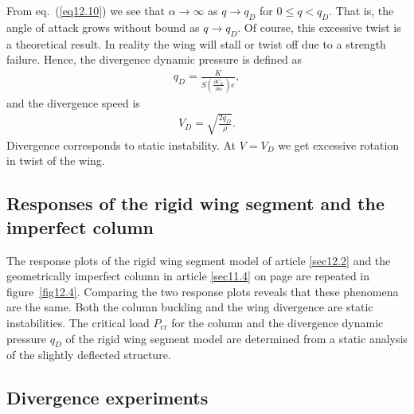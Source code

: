 \documentclass{AeroStructure-ERJohnson}
\begin{document}
From eq.~(\ref{eq12.10}) we see that $\alpha \rightarrow \infty$ as $q \rightarrow q_{D}$ for $0 \leq q<q_{D}$. That is, the angle of attack grows without bound as $q \rightarrow q_{D}$. Of course, this excessive twist is a theoretical result. In reality the wing will stall or twist off due to a strength failure. Hence, the divergence dynamic pressure is defined as
\begin{align}\label{eq12.11}
q_{D}=\frac{K}{S\left(\frac{\partial C_{L}}{\partial \alpha}\right) e},
\end{align}
and the divergence speed is
\begin{align}\label{eq12.12}
V_{D}=\sqrt{\frac{2 q_{D}}{\rho}}.
\end{align}
Divergence corresponds to static instability. At $V=V_{D}$ we get excessive rotation in twist of the wing.


\subsection{Responses of the rigid wing segment and the imperfect column}\label{sec12.2.1}

The response plots of the rigid wing segment model of article \ref{sec12.2} and the geometrically imperfect column in article \ref{sec11.4} on page \pageref{sec11.4} are repeated in figure~\ref{fig12.4}. Comparing the two response plots reveals that these phenomena are the same. Both the column buckling and the wing divergence are static instabilities. The critical load $P_{\mathrm{cr}}$ for the column and the divergence dynamic pressure $q_{D}$ of the rigid wing segment model are determined from a static analysis of the slightly deflected structure.

{\def\thefigure{12.4}
}


\subsection{Divergence experiments}\label{sec12.2.2}
\end{document}
